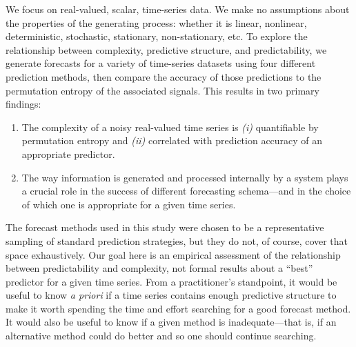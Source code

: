 We focus on real-valued, scalar, time-series data.
%
%
We make no assumptions about the properties of the generating process:
whether it is linear, nonlinear, deterministic, stochastic,
stationary, non-stationary, etc.  To explore the relationship between
complexity, predictive structure, and predictability, we generate
forecasts for a variety of time-series datasets using four different
prediction methods, then compare the accuracy of those predictions to
the permutation entropy of the associated signals.  This results in
two primary findings:
\begin{enumerate}
\item The complexity of a noisy real-valued time series is \emph{(i)}
  quantifiable by permutation entropy and \emph{(ii)} correlated with
  prediction accuracy of an appropriate predictor.
\item The way information is generated and processed internally by a
  system plays a crucial role in the success of different forecasting
  schema---and in the choice of which one is appropriate for a given
time series.
\end{enumerate}
The forecast methods used in this study were chosen to be a
representative sampling of standard prediction strategies, but they do
not, of course, cover that space exhaustively.  Our goal here is an
empirical assessment of the relationship between predictability and
complexity, not formal results about a ``best'' predictor for a given
time series.  From a practitioner's standpoint, it would be useful to
know \emph{ a priori} if a time series contains enough predictive
structure to make it worth spending the time and effort searching for
a good forecast method.  It would also be useful to know if a given
method is inadequate---that is, if an alternative method could do
better and so one should continue searching.


